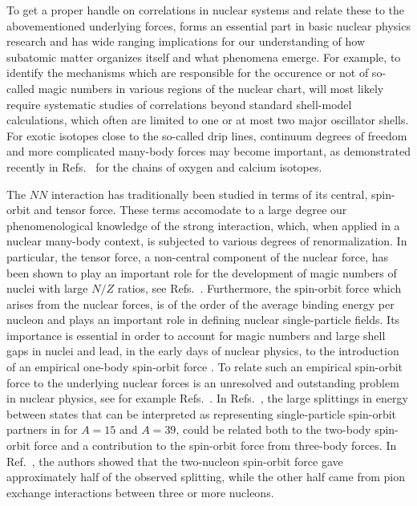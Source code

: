 \documentclass[preprint,12pt,authoryear]{elsarticle}
\begin{document}
To get a proper handle on correlations in nuclear systems and relate
these to the abovementioned underlying forces, forms an essential part
in basic nuclear physics research and has wide ranging implications
for our understanding of how subatomic matter organizes itself and
what phenomena emerge. For example, to identify the mechanisms which
are responsible for the occurence or not of so-called magic numbers in
various regions of the nuclear chart, will most likely require
systematic studies of correlations beyond standard shell-model
calculations, which often are limited to one or at most two major
oscillator shells.  For exotic isotopes close to the so-called drip
lines, continuum degrees of freedom and more complicated many-body
forces may become important, as demonstrated recently in
Refs.~\cite{hagen2012a,hagen2012b} for the chains of oxygen and
calcium isotopes.  

The $NN$ interaction has traditionally been studied
in terms of its central, spin-orbit and tensor force.  These terms
accomodate to a large degree our phenomenological knowledge of the
strong interaction, which, when applied in a nuclear many-body
context, is subjected to various degrees of renormalization.  In
particular, the tensor force, a non-central component of the nuclear
force, has been shown to play an important role for the development of
magic numbers of nuclei with large $N/Z$ ratios, see
Refs.~\cite{otsuka2001,otsuka2005,otsuka2010b,tsunoda2011,smirnova2010}.
Furthermore, the spin-orbit force which arises from the nuclear
forces, is of the order of the average binding energy per
nucleon and plays an important role in defining nuclear
single-particle fields. Its importance is essential in order to account
for magic numbers and large shell gaps in nuclei and lead, in the
early days of nuclear physics, to the introduction of an empirical
one-body spin-orbit force \cite{mayer1949,haxel1949}. To relate such
an empirical spin-orbit force to the underlying nuclear forces is an
unresolved and outstanding problem in nuclear physics, see for example
Refs.~\cite{ando1981,burgunder2014}.  In
Refs.~\cite{ando1981,pieper1993}, the large splittings in energy
between states that can be interpreted as representing single-particle
spin-orbit partners in for $A=15$ and $A=39$, could be related both to
the two-body spin-orbit force and a contribution to the spin-orbit
force from three-body forces. In Ref.~\cite{pieper1993}, the authors
showed that the two-nucleon spin-orbit force gave approximately half
of the observed splitting, while the other half came from pion
exchange interactions between three or more nucleons.
\end{document}
